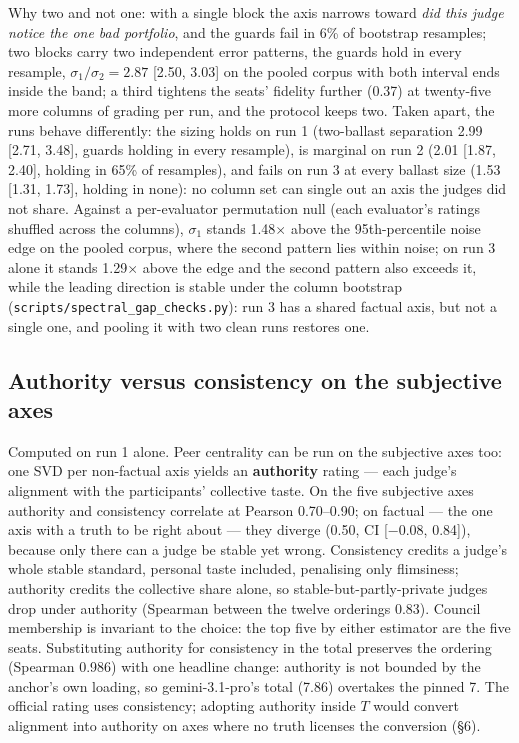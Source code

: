 \documentclass{article}
\begin{document}
Why two and not one: with a single block the axis narrows toward \emph{did this judge notice the one bad portfolio}, and the guards fail in 6\% of bootstrap resamples; two blocks carry two independent error patterns, the guards hold in every resample, \(\sigma_1/\sigma_2 = 2.87\) {[}2.50, 3.03{]} on the pooled corpus with both interval ends inside the band; a third tightens the seats' fidelity further (0.37) at twenty-five more columns of grading per run, and the protocol keeps two. Taken apart, the runs behave differently: the sizing holds on run 1 (two-ballast separation 2.99 {[}2.71, 3.48{]}, guards holding in every resample), is marginal on run 2 (2.01 {[}1.87, 2.40{]}, holding in 65\% of resamples), and fails on run 3 at every ballast size (1.53 {[}1.31, 1.73{]}, holding in none): no column set can single out an axis the judges did not share. Against a per-evaluator permutation null (each evaluator's ratings shuffled across the columns), \(\sigma_1\) stands 1.48\ensuremath{\times} above the 95th-percentile noise edge on the pooled corpus, where the second pattern lies within noise; on run 3 alone it stands 1.29\ensuremath{\times} above the edge and the second pattern also exceeds it, while the leading direction is stable under the column bootstrap (\texttt{scripts/spectral\_\allowbreak{}gap\_\allowbreak{}checks.py}): run 3 has a shared factual axis, but not a single one, and pooling it with two clean runs restores one.

\subsection{Authority versus consistency on the subjective axes}\label{authority-versus-consistency-on-the-subjective-axes}

Computed on run 1 alone. Peer centrality can be run on the subjective axes too: one SVD per non-factual axis yields an \textbf{authority} rating --- each judge's alignment with the participants' collective taste. On the five subjective axes authority and consistency correlate at Pearson 0.70--0.90; on factual --- the one axis with a truth to be right about --- they diverge (0.50, CI {[}\ensuremath{-}0.08, 0.84{]}), because only there can a judge be stable yet wrong. Consistency credits a judge's whole stable standard, personal taste included, penalising only flimsiness; authority credits the collective share alone, so stable-but-partly-private judges drop under authority (Spearman between the twelve orderings 0.83). Council membership is invariant to the choice: the top five by either estimator are the five seats. Substituting authority for consistency in the total preserves the ordering (Spearman 0.986) with one headline change: authority is not bounded by the anchor's own loading, so gemini-3.1-pro's total (7.86) overtakes the pinned 7. The official rating uses consistency; adopting authority inside \(T\) would convert alignment into authority on axes where no truth licenses the conversion (\S{}6).
\end{document}
